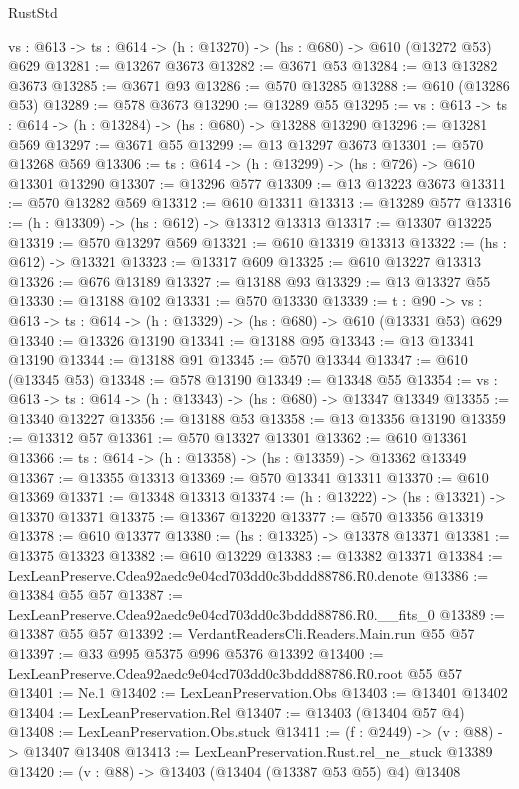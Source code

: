\begin{lexlean}{RustStd}
\begin{coremodule}
  {vs : @613} -> {ts : @614} -> (h : @13270) -> (hs : @680) -> @610 (@13272 @53) @629
@13281 := @13267 @3673
@13282 := @3671 @53
@13284 := @13 @13282 @3673
@13285 := @3671 @93
@13286 := @570 @13285
@13288 := @610 (@13286 @53)
@13289 := @578 @3673
@13290 := @13289 @55
@13295 := {vs : @613} -> {ts : @614} -> (h : @13284) -> (hs : @680) -> @13288 @13290
@13296 := @13281 @569
@13297 := @3671 @55
@13299 := @13 @13297 @3673
@13301 := @570 @13268 @569
@13306 := {ts : @614} -> (h : @13299) -> (hs : @726) -> @610 @13301 @13290
@13307 := @13296 @577
@13309 := @13 @13223 @3673
@13311 := @570 @13282 @569
@13312 := @610 @13311
@13313 := @13289 @577
@13316 := (h : @13309) -> (hs : @612) -> @13312 @13313
@13317 := @13307 @13225
@13319 := @570 @13297 @569
@13321 := @610 @13319 @13313
@13322 := (hs : @612) -> @13321
@13323 := @13317 @609
@13325 := @610 @13227 @13313
@13326 := @676 @13189
@13327 := @13188 @93
@13329 := @13 @13327 @55
@13330 := @13188 @102
@13331 := @570 @13330
@13339 := {t : @90} ->
  {vs : @613} -> {ts : @614} -> (h : @13329) -> (hs : @680) -> @610 (@13331 @53) @629
@13340 := @13326 @13190
@13341 := @13188 @95
@13343 := @13 @13341 @13190
@13344 := @13188 @91
@13345 := @570 @13344
@13347 := @610 (@13345 @53)
@13348 := @578 @13190
@13349 := @13348 @55
@13354 := {vs : @613} -> {ts : @614} -> (h : @13343) -> (hs : @680) -> @13347 @13349
@13355 := @13340 @13227
@13356 := @13188 @53
@13358 := @13 @13356 @13190
@13359 := @13312 @57
@13361 := @570 @13327 @13301
@13362 := @610 @13361
@13366 := {ts : @614} -> (h : @13358) -> (hs : @13359) -> @13362 @13349
@13367 := @13355 @13313
@13369 := @570 @13341 @13311
@13370 := @610 @13369
@13371 := @13348 @13313
@13374 := (h : @13222) -> (hs : @13321) -> @13370 @13371
@13375 := @13367 @13220
@13377 := @570 @13356 @13319
@13378 := @610 @13377
@13380 := (hs : @13325) -> @13378 @13371
@13381 := @13375 @13323
@13382 := @610 @13229
@13383 := @13382 @13371
@13384 := LexLeanPreserve.Cdea92aedc9e04cd703dd0c3bddd88786.R0.denote
@13386 := @13384 @55 @57
@13387 := LexLeanPreserve.Cdea92aedc9e04cd703dd0c3bddd88786.R0.__fits_0
@13389 := @13387 @55 @57
@13392 := VerdantReadersCli.Readers.Main.run @55 @57
@13397 := @33 @995 @5375 @996 @5376 @13392
@13400 := LexLeanPreserve.Cdea92aedc9e04cd703dd0c3bddd88786.R0.root @55 @57
@13401 := Ne.{1}
@13402 := LexLeanPreservation.Obs
@13403 := @13401 @13402
@13404 := LexLeanPreservation.Rel
@13407 := @13403 (@13404 @57 @4)
@13408 := LexLeanPreservation.Obs.stuck
@13411 := (f : @2449) -> (v : @88) -> @13407 @13408
@13413 := LexLeanPreservation.Rust.rel_ne_stuck @13389
@13420 := (v : @88) -> @13403 (@13404 (@13387 @53 @55) @4) @13408

\end{coremodule}
\end{lexlean}
